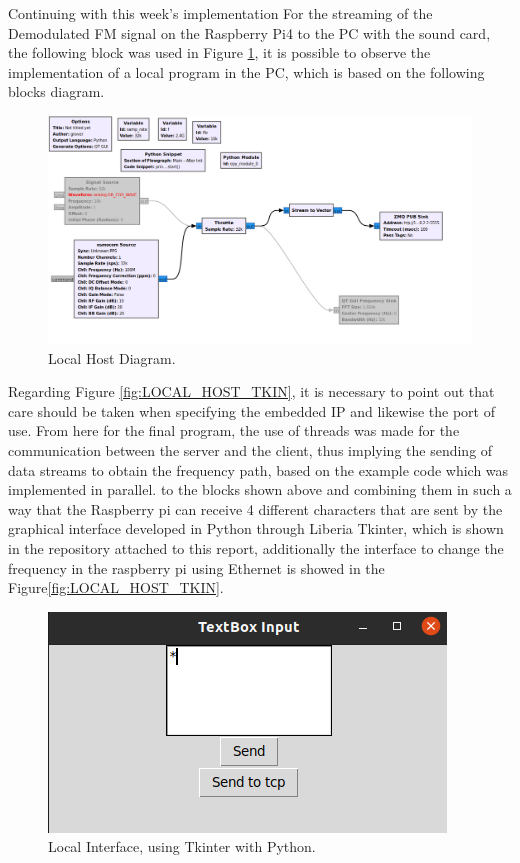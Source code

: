 \documentclass[12pt, twoside]{report}
\begin{document}
Continuing with this week's implementation For the streaming of the Demodulated FM signal on the Raspberry Pi4 to the PC with the sound card, the following block was used in Figure \ref{fig:LOCAL_HOST}, it is possible to observe the implementation of a local program in the PC, which is based on the following blocks diagram.\\
\begin{figure}[!h]
\centering
  \includegraphics[width=\linewidth]{images/RPI_2WEEK.png}
  \caption{Local Host Diagram.}
  \label{fig:LOCAL_HOST}
\end{figure}

Regarding Figure \ref{fig:LOCAL_HOST_TKIN}, it is necessary to point out that care should be taken when specifying the embedded IP and likewise the port of use.
From here for the final program, the use of threads was made for the communication between the server and the client, thus implying the sending of data streams to obtain the frequency path, based on the example code which was implemented in parallel. to the blocks shown above and combining them in such a way that the Raspberry pi can receive 4 different characters that are sent by the graphical interface developed in Python through Liberia Tkinter, which is shown in the repository attached to this report, additionally the interface to change the frequency in the raspberry pi using Ethernet is showed in the Figure\ref{fig:LOCAL_HOST_TKIN}.

\begin{figure}[!h]
\centering
  \includegraphics[width=\linewidth]{images/interfacea1.png}
  \caption{Local Interface, using Tkinter with Python.}
  \label{fig:LOCAL_HOST_TKINYER}
\end{figure}
\end{document}
